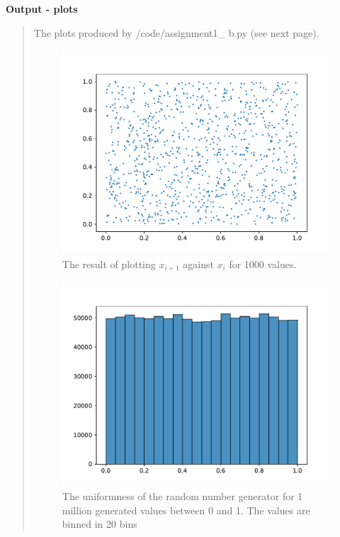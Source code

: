 \textbf{Output - plots}
\begin{quote}
The plots produced by \textsf{/code/assignment1\_ b.py} (see next page).
\newpage
\begin{figure}[!ht]
\centering
\includegraphics[scale=0.8]{plots/random_next_current.pdf}
\caption{The result of plotting $x_{i+1}$ against $x_i$ for 1000 values. }
\end{figure}
 

\begin{figure}[!hb]
\centering
\includegraphics[scale=0.8]{plots/random_uniformness.pdf}
\caption{The uniformness of the random number generator for 1 million generated values between 0 and 1. The values are binned in 20 bins}
\end{figure}
\end{quote}
\newpage
\newpage




%








